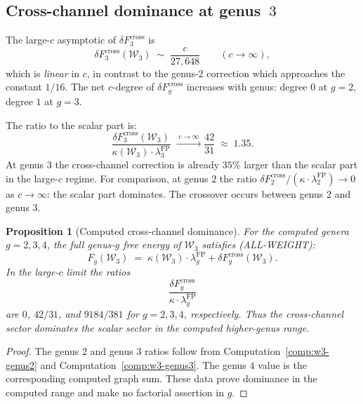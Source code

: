 \documentclass[11pt]{article}
\newtheorem{proposition}[theorem]{Proposition}
\theoremstyle{definition}
\theoremstyle{remark}
\newcommand{\Walg}{\mathcal{W}}
\newcommand{\FP}{\mathrm{FP}}
\newcommand{\cross}{\mathrm{cross}}
\numberwithin{equation}{section}
\begin{document}
\subsection{Cross-channel dominance at genus~$3$}

The large-$c$ asymptotic of $\delta F_3^{\cross}$ is
\begin{equation}\label{eq:w3-genus3-large-c}
 \delta F_3^{\cross}(\Walg_3)
 \;\sim\;
 \frac{c}{27{,}648}
 \qquad (c \to \infty),
\end{equation}
which is \emph{linear} in $c$, in contrast to the genus-$2$
correction which approaches the constant $1/16$.
The net $c$-degree of $\delta F_g^{\cross}$ increases with
genus: degree $0$ at $g = 2$, degree $1$ at $g = 3$.

The ratio to the scalar part is:
\begin{equation}\label{eq:w3-genus3-ratio}
 \frac{\delta F_3^{\cross}(\Walg_3)}%
 {\kappa(\Walg_3) \cdot \lambda_3^{\FP}}
 \;\xrightarrow{\;c \to \infty\;}
 \frac{42}{31}
 \;\approx\; 1.35.
\end{equation}
At genus $3$ the cross-channel correction is already
$35\%$ larger than the scalar part in the large-$c$ regime.
For comparison, at genus $2$ the ratio
$\delta F_2^{\cross}/(\kappa \cdot \lambda_2^{\FP})
\to 0$ as $c \to \infty$: the scalar part dominates.
The crossover occurs between genus $2$ and genus $3$.

\begin{proposition}[Computed cross-channel dominance]\label{prop:cross-dominance}
For the computed genera \(g=2,3,4\), the full genus-$g$ free energy
of $\Walg_3$ satisfies
\textup{(ALL-WEIGHT)}:
\begin{equation}\label{eq:all-weight-full}
 F_g(\Walg_3)
 \;=\;
 \kappa(\Walg_3) \cdot \lambda_g^{\FP}
 + \delta F_g^{\cross}(\Walg_3).
\end{equation}
In the large-\(c\) limit the ratios
\[
\frac{\delta F_g^{\cross}}{\kappa \cdot \lambda_g^{\FP}}
\]
are \(0\), \(42/31\), and \(9184/381\) for \(g=2,3,4\),
respectively. Thus the cross-channel sector dominates the scalar
sector in the computed higher-genus range.
\end{proposition}

\begin{proof}
The genus \(2\) and genus \(3\) ratios follow from
Computation~\ref{comp:w3-genus2} and
Computation~\ref{comp:w3-genus3}. The genus \(4\) value is the
corresponding computed graph sum. These data prove dominance in the
computed range and make no factorial assertion in \(g\).
\end{proof}
\end{document}
